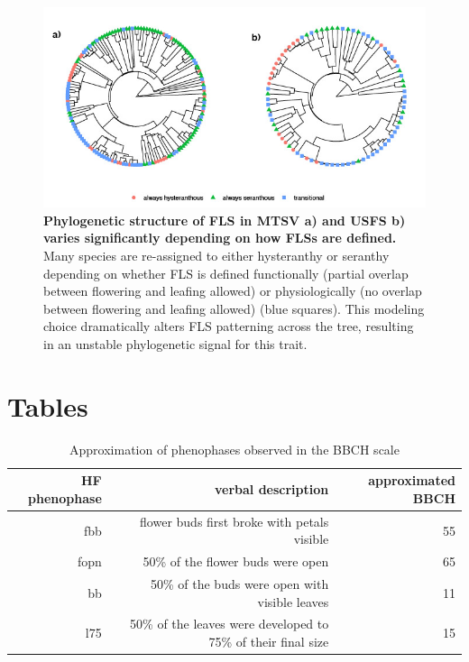 \documentclass[11pt]{article}\usepackage[]{graphicx}\usepackage[]{color}
\begin{document}
\begin{figure}[H]
\centering
\includegraphics[width=\textwidth]{..//..//cicletrees.jpg} 
  \caption{\textbf{Phylogenetic structure of FLS in MTSV \textbf{a)} and USFS \textbf{b)} varies significantly depending on how FLSs are defined.} Many species are re-assigned to either hysteranthy or seranthy depending on whether FLS is defined functionally (partial overlap between flowering and leafing allowed) or physiologically (no overlap between flowering and leafing allowed) (blue squares). This modeling choice dramatically alters FLS patterning across the tree, resulting in an unstable phylogenetic signal for this trait.}
    \label{fig:phylogeny}
    \end{figure}

\section*{Tables}

\begin{table}[H]
\centering
\begin{tabular}{rrr}
  \hline
  HF phenophase & verbal description & approximated BBCH  \\ 
  \hline
  fbb & flower buds first broke with petals visible & 55 \\
  fopn &  50\% of the flower buds were open & 65 \\
 bb &  50\% of the buds were open with visible leaves & 11 \\
 l75 & 50\% of the leaves were developed to 75\% of their final size &  15 \\
   \hline
\end{tabular}
\caption{Approximation of phenophases observed in \citep{OKeefe2015} the BBCH scale \citep{Finn2007}} 
\label{BBCH2HF}
\end{table}
\end{document}
